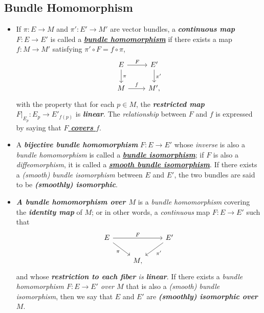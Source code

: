 \documentclass[11pt]{article}
\begin{document}
\subsection{Bundle Homomorphism}
\begin{itemize}
\item \begin{definition}
If $\pi: E \rightarrow M$ and $\pi': E' \rightarrow M'$ are vector bundles, a \emph{\textbf{continuous map}} $F: E \rightarrow E'$ is called a \underline{\emph{\textbf{bundle homomorphism}}} if there exists a map $f: M \rightarrow M'$ satisfying $\pi' \circ F = f \circ \pi$,
\[
  \begin{tikzcd}
    E \arrow{r}{F} \arrow{d}{\pi} &  E' \arrow{d}{\pi'} \\
    M                \arrow{r}{f}                                &  M',
  \end{tikzcd}
\] with the property that for each $p \in M$, the \emph{\textbf{restricted map}} $F|_{E_{p}}: E_p \rightarrow E'_{f(p)}$ is \emph{\textbf{linear}}. The \emph{relationship} between $F$ and $f$ is expressed by saying that \underline{\emph{$F$ \textbf{covers} $f$}}.
\end{definition}

\item \begin{definition}
A \emph{\textbf{bijective bundle homomorphism}} $F: E \rightarrow E'$ whose \emph{inverse} is also a \emph{bundle homomorphism} is called a \underline{\emph{\textbf{bundle isomorphism}}}; if $F$ is also a \emph{diffeomorphism}, it is called a \underline{\emph{\textbf{smooth bundle isomorphism}}}. If there exists a \emph{(smooth) bundle isomorphism} between $E$ and $E'$, the two bundles are said to be \emph{\textbf{(smoothly) isomorphic}}.
\end{definition}

\item \begin{definition}
\emph{\textbf{A bundle homomorphism over $M$}} is a \emph{bundle homomorphism} covering the
\emph{\textbf{identity map}} of $M$; or in other words, a \emph{continuous} map $F: E \rightarrow E'$ such that
\[
  \begin{tikzcd}
    E \arrow{rr}{F} \arrow[swap]{dr}{\pi} &  & E' \arrow{dl}{\pi'} \\
    & M,              &  
  \end{tikzcd}
\]
and whose \emph{\textbf{restriction to each fiber} is \textbf{linear}}. If there exists a \emph{bundle homomorphism $F: E \rightarrow E'$ over $M$} that is also a \emph{(smooth) bundle isomorphism}, then we say that $E$ and $E'$ are \emph{\textbf{(smoothly) isomorphic over $M$}}. 
\end{definition}


\end{itemize}
\end{document}
